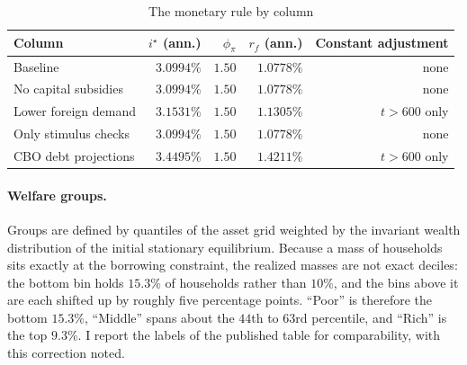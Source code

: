 \begin{table}[t]\centering
\caption{The monetary rule by column}\label{tab:rule}
\small
\begin{tabular}{lrrrr}
\toprule
Column & $i^\star$ (ann.) & $\phi_\pi$ & $r_f$ (ann.) & Constant adjustment \\
\midrule
Baseline                 & $3.0994\%$ & $1.50$ & $1.0778\%$ & none \\
No capital subsidies     & $3.0994\%$ & $1.50$ & $1.0778\%$ & none \\
Lower foreign demand     & $3.1531\%$ & $1.50$ & $1.1305\%$ & $t>600$ only \\
Only stimulus checks     & $3.0994\%$ & $1.50$ & $1.0778\%$ & none \\
CBO debt projections     & $3.4495\%$ & $1.50$ & $1.4211\%$ & $t>600$ only \\
\bottomrule
\end{tabular}
\end{table}

\paragraph{Welfare groups.} Groups are defined by quantiles of the asset grid
weighted by the invariant wealth distribution of the initial stationary
equilibrium. Because a mass of households sits exactly at the borrowing
constraint, the realized masses are not exact deciles: the bottom bin holds
$15.3\%$ of households rather than $10\%$, and the bins above it are each
shifted up by roughly five percentage points. ``Poor'' is therefore the bottom
$15.3\%$, ``Middle'' spans about the $44$th to $63$rd percentile, and ``Rich''
is the top $9.3\%$. I report the labels of the published table for
comparability, with this correction noted.

